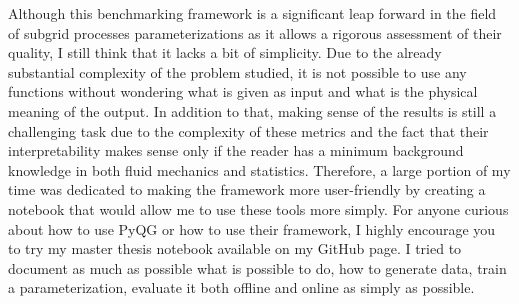 Although this benchmarking framework is a significant leap forward in the field of subgrid processes parameterizations as it allows a rigorous assessment of their quality, I still think that it lacks a bit of simplicity. Due to the already substantial complexity of the problem studied, it is not possible to use any functions without wondering what is given as input and what is the physical meaning of the output. In addition to that, making sense of the results is still a challenging task due to the complexity of these metrics and the fact that their interpretability makes sense only if the reader has a minimum background knowledge in both fluid mechanics and statistics. Therefore, a large portion of my time was dedicated to making the framework more user-friendly by creating a notebook that would allow me to use these tools more simply. For anyone curious about how to use PyQG or how to use their framework, I highly encourage you to try my master thesis notebook available on my GitHub page. I tried to document as much as possible what is possible to do, how to generate data, train a parameterization, evaluate it both offline and online as simply as possible.
















































